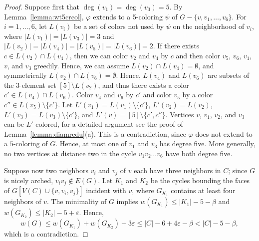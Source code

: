 \documentclass[12pt,twoside,openright,a4paper]{book}
\begin{document}
\begin{proof}
Suppose first that $\deg(v_1)=\deg(v_3)=5$.  By Lemma~\ref{lemma:wt5crcol}, $\varphi$ extends
to a 5-coloring $\psi$ of $G-\{v,v_1,\ldots,v_6\}$.  For $i=1,\ldots, 6$, let $L(v_i)$ be a
set of colors not used by $\psi$ on the neighborhood of $v_i$, where $|L(v_1)|=|L(v_3)|=3$
and $|L(v_2)|=|L(v_4)|=|L(v_5)|=|L(v_6)|=2$.  If there exists $c\in L(v_2)\cap L(v_4)$, then
we can color $v_2$ and $v_4$ by $c$ and then color $v_5$, $v_6$, $v_1$, $v$, and $v_3$ greedily.
Hence, we can assume $L(v_2)\cap L(v_4)=\emptyset$, and symmetrically $L(v_2)\cap L(v_6)=\emptyset$.
Hence, $L(v_4)$ and $L(v_6)$ are subsets of the $3$-element set $[5]\setminus L(v_2)$, and thus
there exists a color $c'\in L(v_4)\cap L(v_6)$.  Color $v_4$ and $v_6$ by $c'$ and color $v_5$
by a color $c''\in L(v_5)\setminus \{c'\}$.  Let $L'(v_1)=L(v_1)\setminus\{c'\}$,
$L'(v_2)=L(v_2)$, $L'(v_3)=L(v_3)\setminus \{c'\}$, and $L'(v)=[5]\setminus\{c',c''\}$.
Vertices $v$, $v_1$, $v_2$, and $v_3$ can be $L'$-colored, for a detailed argument see
the proof of Lemma~\ref{lemma:diamredu}(a).  This is a contradiction, since $\varphi$ does not
extend to a $5$-coloring of $G$.
Hence, at most one of $v_1$ and $v_3$ has degree five.  More generally, no two vertices
at distance two in the cycle $v_1v_2\ldots v_6$ have both degree five.

Suppose now two neighbors $v_i$ and $v_j$ of $v$ each have three neighbors in $C$;
since $G$ is nicely arched, $v_iv_j\not\in E(G)$.
Let $K_1$ and $K_2$ be the cycles bounding the faces of
$G[V(C)\cup \{v,v_i,v_j\}]$ incident with $v$, where $G_{K_1}$ contains at least four
neighbors of $v$.  The minimality of $G$ implies $w(G_{K_1})\le |K_1|-5-\beta$
and $w(G_{K_2})\le |K_2|-5+\varepsilon$.
Hence,
$$w(G)\le w(G_{K_1})+w(G_{K_2})+3\varepsilon\le |C|-6+4\varepsilon-\beta<|C|-5-\beta,$$
which is a contradiction.


\end{proof}
\end{document}
